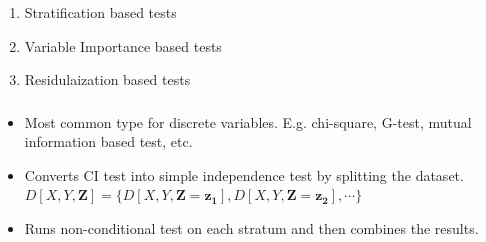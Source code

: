 \documentclass{beamer}
\begin{document}
\begin{frame}
	\frametitle{}
	\begin{enumerate}
		\setlength\itemsep{1em}
		\item Stratification based tests
		\item Variable Importance based tests
		\item Residulaization based tests
	\end{enumerate}
\end{frame}

\begin{frame}
	\frametitle{}
	\begin{itemize}
		\setlength\itemsep{1em}
		\item Most common type for discrete variables. E.g. chi-square, G-test,
			mutual information based test, etc. 
		\item Converts CI test into simple independence test by splitting 
			the dataset.
		$ D[X, Y, \bm{Z}] = \{ D[X, Y, \bm{Z}=\bm{z_1}], D[X, Y, \bm{Z}=\bm{z_2}], \cdots \} $	
		\item Runs non-conditional test on each stratum and then combines the results.
	\end{itemize}
\end{frame}
\end{document}
